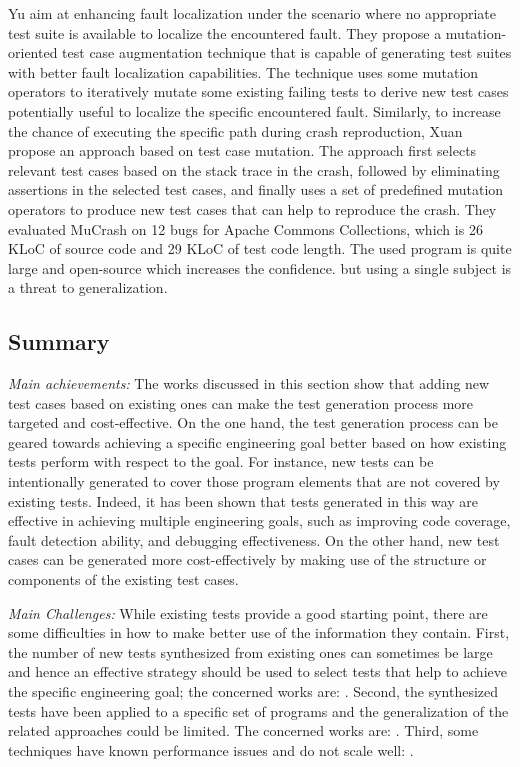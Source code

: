 Yu \etal\cite{Yu2013} aim at enhancing fault localization under the scenario where no appropriate test suite is available to localize the encountered fault. 
They propose a mutation-oriented test case augmentation technique that is capable of generating test suites with better fault localization capabilities. 
The technique uses some mutation operators to iteratively mutate some existing failing tests to derive new test cases potentially useful to localize the specific encountered fault. 
Similarly, to increase the chance of executing the specific path during crash reproduction, Xuan \etal\cite{Xuan:2015:CRV:2786805.2803206} propose an approach based on test case mutation. 
The approach first selects relevant test cases based on the stack trace in the crash, followed by eliminating assertions in the selected test cases, and finally uses a set of predefined mutation operators to produce new test cases that can help to reproduce the crash. 
They evaluated MuCrash on 12 bugs for Apache Commons Collections, which is  26 KLoC of source code and 29 KLoC of test code length. 
The used program is quite large and open-source which increases the confidence. but using a single subject is a threat to generalization.

\subsection{Summary}
\label{subsec:sota:category-1:summary}

\emph{Main achievements:}
The works discussed in this section show that adding new test cases based on existing ones can make the test generation process more targeted and cost-effective. 
On the one hand, the test generation process can be geared towards achieving a specific engineering goal better based on how existing tests perform with respect to the goal. 
For instance, new tests can be intentionally generated to cover those program elements that are not covered by existing tests. 
Indeed, it has been shown that tests generated in this way are effective in achieving multiple engineering goals, such as improving code coverage, fault detection ability, and debugging effectiveness. 
On the other hand, new test cases can be generated more cost-effectively by making use of the structure or components of the existing test cases. 

\emph{Main Challenges:}
While existing tests provide a good starting point, there are some difficulties in how to make better use of the information they contain.
First, the number of new tests synthesized from existing ones can sometimes be large and hence an effective strategy should be used to select tests that help to achieve the specific engineering goal;
the concerned works are: \cite{Baudry05a, Baudry05d, Yoshida2016}.
Second, the synthesized tests have been applied to a specific set of programs and the generalization of the related approaches could be limited. 
The concerned works are: \cite{tillmann2006unit, marri2010retrofitting, yoo2012, 6958388, Patrick201736, Harder03, Pacheco2005, Baudry:2006:ITS:1134285.1134299, robetaler2012isolating, Xuan:2015:CRV:2786805.2803206}.
Third, some techniques have known performance issues and do not scale well: \cite{milani2014, fraser2011generating}.


